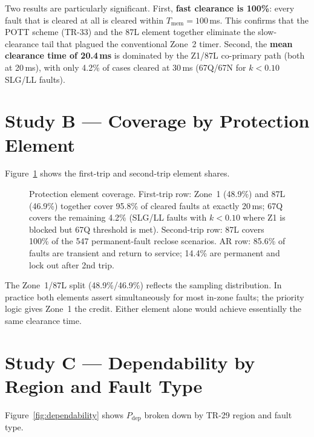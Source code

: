 \documentclass[11pt,a4paper]{article}
\begin{document}
\medskip\noindent
Two results are particularly significant.  First, \textbf{fast clearance is
100\%}: every fault that is cleared at all is cleared within $T_\mathrm{mem}=100$\,ms.
This confirms that the POTT scheme (TR-33) and the 87L element together eliminate
the slow-clearance tail that plagued the conventional Zone~2 timer.  Second,
the \textbf{mean clearance time of 20.4\,ms} is dominated by the Z1/87L
co-primary path (both at 20\,ms), with only 4.2\% of cases cleared at 30\,ms
(67Q/67N for $k<0.10$ SLG/LL faults).

\section{Study B --- Coverage by Protection Element}
\label{sec:studyB}

Figure~\ref{fig:elements} shows the first-trip and second-trip element shares.

\begin{figure}[htbp]
  \centering
  \resizebox{0.88\textwidth}{!}{}
  \caption{Protection element coverage.  First-trip row: Zone~1 (48.9\%)
           and 87L (46.9\%) together cover 95.8\% of cleared faults at
           exactly 20\,ms; 67Q covers the remaining 4.2\% (SLG/LL faults
           with $k<0.10$ where Z1 is blocked but 67Q threshold is met).
           Second-trip row: 87L covers 100\% of the 547 permanent-fault
           reclose scenarios.  AR row: 85.6\% of faults are transient and
           return to service; 14.4\% are permanent and lock out after 2nd trip.}
  \label{fig:elements}
\end{figure}

\noindent
The Zone~1/87L split (48.9\%/46.9\%) reflects the sampling distribution.  In
practice both elements assert simultaneously for most in-zone faults; the
priority logic gives Zone~1 the credit.  Either element alone would achieve
essentially the same clearance time.

\section{Study C --- Dependability by Region and Fault Type}
\label{sec:studyC}

Figure~\ref{fig:dependability} shows $P_\mathrm{dep}$ broken down by TR-29
region and fault type.
\end{document}
